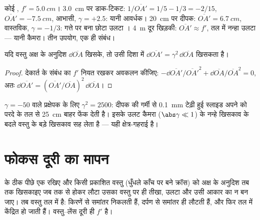 \begin{example}[एक ही लेंस, तीन काम]\label{ex:b1:mirrors-thin-lenses:lensuses}
कोई , $f' = \qty{5.0}{cm}$। \qty{3.0}{cm} पर डाक-टिकट:
$1/\overline{OA'} = 1/5 - 1/3 = -2/15$, $\overline{OA'} = \qty{-7.5}{cm}$,
आभासी, $\gamma = +2.5$: यानी आवर्धक। \qty{20}{cm} पर दीपक:
$\overline{OA'} = \qty{6.7}{cm}$, वास्तविक, $\gamma = -1/3$: गत्ते पर बना
छोटा उलटा । \qty{4}{m} दूर खिड़की: $\overline{OA'}
\approx f'$,  तल में नन्हा उलटा  --- यानी कैमरा।
तीन उपयोग, एक ही संबंध।
\end{example}

\begin{proposition}[अनुदैर्घ्य आवर्धन]\label{prop:b1:mirrors-thin-lenses:longitudinal}
यदि वस्तु अक्ष के अनुदिश $\dd\overline{OA}$ खिसके, तो  उसी दिशा में
$\dd\overline{OA'} = \gamma^2\,\dd\overline{OA}$ खिसकता
है।
\end{proposition}

\begin{proof}
देकार्त के संबंध का $f'$ नियत रखकर अवकलन कीजिए:
$-\dd\overline{OA'}/\overline{OA'}^2 + \dd\overline{OA}/\overline{OA}^2 = 0$,
अतः $\dd\overline{OA'} = (\overline{OA'}/\overline{OA})^2\,\dd\overline{OA}$।
\end{proof}

\begin{remark}[फोकस की गहराई]\label{rem:b1:mirrors-thin-lenses:depth}
$\gamma = -50$ वाले प्रक्षेपक के लिए $\gamma^2 = 2500$: दीपक की गर्मी से
\qty{0.1}{mm} टेढ़ी हुई स्लाइड अपने  को परदे के तल से
\qty{25}{cm} बाहर फेंक देती है। इसके उलट कैमरा ($\abs\gamma
\ll 1$)  के नन्हे खिसकाव के बदले वस्तु के बड़े खिसकाव सह लेता है ---
यही क्षेत्र-गहराई है।
\end{remark}

\section{फोकस दूरी का मापन}

\begin{method}[स्वसंरेखण]\label{met:b1:mirrors-thin-lenses:autocollimation}
 के ठीक पीछे एक  रखिए और किसी प्रकाशित वस्तु (धुँधले काँच पर बने
क्रॉस) को अक्ष के अनुदिश तब तक खिसकाइए जब तक  से होकर लौटा उसका 
वस्तु पर ही तीखा, उलटा और उसी आकार का न बन जाए। तब वस्तु  तल में है:
किरणें  से समांतर निकलती हैं, दर्पण से समांतर ही लौटती हैं, और फिर 
तल में केंद्रित हो जाती हैं। वस्तु--लेंस दूरी ही $f'$ है।
\end{method}

